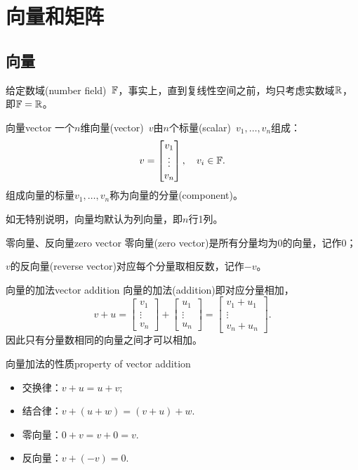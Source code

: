 \chapter{向量和矩阵}

\section{向量}

给定数域(number field)~$\mathbb F$，事实上，直到复线性空间之前，均只考虑实数域$\mathbb R$，即$\mathbb F=\mathbb R$。

\begin{definition}{向量}{vector}
	一个$n$维向量(vector)~$v$由$n$个标量(scalar)~$v_1,\ldots,v_n$组成：
	\[
		v=\begin{bmatrix}
			v_1\\\vdots\\v_n
		\end{bmatrix},\quad v_i\in\mathbb F.
	\]
	组成向量的标量$v_1,\ldots,v_n$称为向量的分量(component)。
\end{definition}
如无特别说明，向量均默认为列向量，即$n$行1列。
\begin{definition}{零向量、反向量}{zero vector}
	零向量(zero vector)是所有分量均为0的向量，记作0；
	
	$v$的反向量(reverse vector)对应每个分量取相反数，记作$-v$。
\end{definition}
\begin{definition}{向量的加法}{vector addition}
	向量的加法(addition)即对应分量相加，
	\[
		v+u=\begin{bmatrix}
			v_1\\\vdots\\v_n
		\end{bmatrix}+\begin{bmatrix}
			u_1\\\vdots\\u_n
		\end{bmatrix}=\begin{bmatrix}
			v_1+u_1\\\vdots\\v_n+u_n
		\end{bmatrix}.
	\]
	因此只有分量数相同的向量之间才可以相加。
\end{definition}
\begin{theorem}{向量加法的性质}{property of vector addition}
    \begin{itemize}
    	\item 交换律：$v+u=u+v;$
    	\item 结合律：$v+(u+w)=(v+u)+w.$
    	\item 零向量：$0+v=v+0=v.$
    	\item 反向量：$v+(-v)=0.$
    \end{itemize}
\end{theorem}
